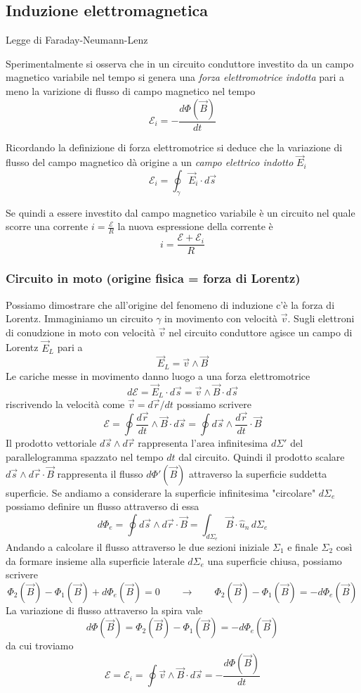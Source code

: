 \documentclass[x11names]{report}
\newcommand{\teorema}[2]{
	\begin{center}
		\fboxsep11pt
		\colorbox{myred}{\begin{minipage}{5.75in}
				\begin{redes}{#1}
					#2
				\end{redes}
		\end{minipage}}
	\end{center}
}
\begin{document}
\subsection{Induzione elettromagnetica}
\teorema{Legge di Faraday-Neumann-Lenz}{
Sperimentalmente si osserva che in un circuito conduttore investito da un campo magnetico variabile nel tempo si genera una \textit{forza elettromotrice indotta} pari a meno la varizione di flusso di campo magnetico nel tempo
\begin{equation}
	\mathcal{E}_i = -\frac{d\Phi(\vec{B})}{dt}
\end{equation}}
Ricordando la definizione di forza elettromotrice si deduce che la variazione di flusso del campo magnetico dà origine a un \textit{campo elettrico indotto} \(\vec{E}_i\)
\[
\mathcal{E}_i = \oint_\gamma \vec{E}_i \cdot d\vec{s}
\]

Se quindi a essere investito dal campo magnetico variabile è un circuito nel quale scorre una corrente \(i = \frac{\mathcal{E}}{R}\) la nuova espressione della corrente è 
\[
i = \frac{\mathcal{E} + \mathcal{E}_i}{R}
\]

\subsubsection*{Circuito in moto (origine fisica = forza di Lorentz)}
Possiamo dimostrare che all'origine del fenomeno di induzione c'è la forza di Lorentz. Immaginiamo un circuito \(\gamma\) in movimento con velocità \(\vec{v}\). Sugli elettroni di conudzione in moto con velocità \(\vec{v}\) nel circuito conduttore agisce un campo di Lorentz \(\vec{E}_L\) pari a
\[
\vec{E}_L = \vec{v}\wedge\vec{B}
\]
Le cariche messe in movimento danno luogo a una forza elettromotrice
\[
d\mathcal{E} = \vec{E}_L \cdot d\vec{s} = \vec{v}\wedge\vec{B} \cdot d\vec{s}
\]
riscrivendo la velocità come \(\vec{v}=d\vec{r}/dt\) possiamo scrivere
\[
\mathcal{E} = \oint  \frac{d\vec{r}}{dt}\wedge\vec{B}\cdot d\vec{s} = \oint  d\vec{s}\wedge\frac{d\vec{r}}{dt}\cdot \vec{B}
\]
Il prodotto vettoriale \(d\vec{s}\wedge d\vec{r}\) rappresenta l'area infinitesima \(d\Sigma'\) del parallelogramma spazzato nel tempo \(dt\) dal circuito. Quindi il prodotto scalare \(d\vec{s}\wedge d\vec{r}\cdot \vec{B}\) rappresenta il flusso \(d\Phi'(\vec{B})\) attraverso la superficie suddetta superficie. Se andiamo a considerare la superficie infinitesima "circolare" \(d\Sigma_e\) possiamo definire un flusso attraverso di essa
\[
d\Phi_e = \oint d\vec{s}\wedge d\vec{r}\cdot \vec{B} = \int_{d\Sigma_e} \vec{B}\cdot \hat{u}_n \, d\Sigma_e
\]
Andando a calcolare il flusso attraverso le due sezioni iniziale \(\Sigma_1\) e finale \(\Sigma_2\) così da formare insieme alla superficie laterale \(d\Sigma_e\) una superficie chiusa, possiamo scrivere
\[
\Phi_2 (\vec{B})- \Phi_1(\vec{B}) + d\Phi_e(\vec{B}) = 0  \qquad \to \qquad \Phi_2 (\vec{B})- \Phi_1(\vec{B}) =  -d\Phi_e(\vec{B}) 
\]
La variazione di flusso attraverso la spira vale
\[
d\Phi(\vec{B}) = \Phi_2 (\vec{B})- \Phi_1(\vec{B}) = -d\Phi_e(\vec{B}) 
\]
da cui troviamo
\begin{equation}
	\mathcal{E} = \mathcal{E}_i = \oint \vec{v}\wedge\vec{B}\cdot d\vec{s} = -\frac{d\Phi(\vec{B})}{dt}
\end{equation}
\end{document}
